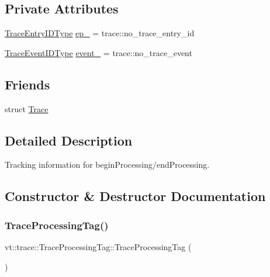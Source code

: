 \subsection*{Private Attributes}
\begin{DoxyCompactItemize}
\item 
\hyperlink{namespacevt_1_1trace_a3c14050715ba9eceaeff51fb3de64f2f}{Trace\+Entry\+I\+D\+Type} \hyperlink{structvt_1_1trace_1_1_trace_processing_tag_a60c4d398c815ba8b140f328ce546a918}{ep\+\_\+} = trace\+::no\+\_\+trace\+\_\+entry\+\_\+id
\item 
\hyperlink{namespacevt_1_1trace_a64a7185f3e102df8d8258f263ccd1582}{Trace\+Event\+I\+D\+Type} \hyperlink{structvt_1_1trace_1_1_trace_processing_tag_ac0ed5366eaeca6f02cb4db7bafdaf732}{event\+\_\+} = trace\+::no\+\_\+trace\+\_\+event
\end{DoxyCompactItemize}
\subsection*{Friends}
\begin{DoxyCompactItemize}
\item 
struct \hyperlink{structvt_1_1trace_1_1_trace_processing_tag_a2e6db6037effb09584d7eba75b16dec4}{Trace}
\end{DoxyCompactItemize}


\subsection{Detailed Description}
Tracking information for begin\+Processing/end\+Processing. 

\subsection{Constructor \& Destructor Documentation}
\mbox{\label{structvt_1_1trace_1_1_trace_processing_tag_af06f6265d03791717242e1cec769dd84}} 
\subsubsection{\texorpdfstring{Trace\+Processing\+Tag()}{TraceProcessingTag()}\hspace{0.1cm}{\footnotesize\ttfamily [1/3]}}
{\footnotesize\ttfamily vt\+::trace\+::\+Trace\+Processing\+Tag\+::\+Trace\+Processing\+Tag (\begin{DoxyParamCaption}{ }\end{DoxyParamCaption})\hspace{0.3cm}{\ttfamily [default]}}

